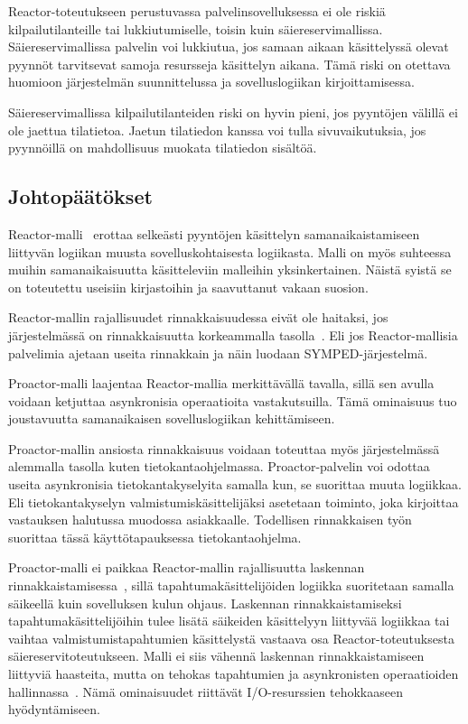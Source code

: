 \documentclass[finnish]{tktltiki2}
\theoremstyle{definition}
\theoremstyle{remark}
\begin{document}
Reactor-toteutukseen perustuvassa palvelinsovelluksessa ei ole
riskiä kilpailutilanteille tai lukkiutumiselle, toisin kuin säiereservimallissa.
Säiereservimallissa palvelin voi lukkiutua, jos samaan aikaan käsittelyssä olevat
pyynnöt tarvitsevat samoja resursseja käsittelyn aikana. Tämä riski on otettava
huomioon järjestelmän suunnittelussa ja sovelluslogiikan kirjoittamisessa.

Säiereservimallissa kilpailutilanteiden riski on hyvin pieni, jos pyyntöjen
välillä ei ole jaettua tilatietoa. Jaetun tilatiedon kanssa voi tulla
sivuvaikutuksia, jos pyynnöillä on mahdollisuus muokata tilatiedon sisältöä.

\subsection{Johtopäätökset}
Reactor-malli~\cite{schmidt_reactor:_1995} erottaa
selkeästi pyyntöjen käsittelyn
samanaikaistamiseen liittyvän
logiikan muusta sovelluskohtaisesta logiikasta.
Malli on myös suhteessa muihin samanaikaisuutta
käsitteleviin malleihin yksinkertainen.
Näistä syistä se on toteutettu useisiin
kirjastoihin ja saavuttanut vakaan suosion.

Reactor-mallin rajallisuudet rinnakkaisuudessa
eivät ole haitaksi, jos järjestelmässä on rinnakkaisuutta
korkeammalla tasolla~\cite{schmidt_reactor:_1995}. Eli
jos Reactor-mallisia palvelimia ajetaan useita rinnakkain
ja näin luodaan SYMPED-järjestelmä.

Proactor-malli laajentaa Reactor-mallia merkittävällä tavalla,
sillä sen avulla voidaan ketjuttaa asynkronisia
operaatioita vastakutsuilla. Tämä ominaisuus
tuo joustavuutta samanaikaisen sovelluslogiikan kehittämiseen.

Proactor-mallin ansiosta rinnakkaisuus
voidaan toteuttaa myös järjestelmässä alemmalla
tasolla kuten tietokantaohjelmassa.
Proactor-palvelin voi odottaa useita asynkronisia
tietokantakyselyita samalla kun, se suorittaa
muuta logiikkaa. Eli tietokantakyselyn valmistumiskäsittelijäksi
asetetaan toiminto, joka kirjoittaa vastauksen
halutussa muodossa asiakkaalle.
Todellisen rinnakkaisen työn
suorittaa tässä käyttötapauksessa tietokantaohjelma.

Proactor-malli ei paikkaa
Reactor-mallin rajallisuutta laskennan rinnakkaistamisessa~\cite{pyarali_proactor_1997},
sillä tapahtumakäsittelijöiden logiikka suoritetaan
samalla säikeellä kuin sovelluksen kulun ohjaus.
Laskennan rinnakkaistamiseksi tapahtumakäsittelijöihin
tulee lisätä säikeiden käsittelyyn liittyvää logiikkaa
tai vaihtaa valmistumistapahtumien käsittelystä vastaava
osa Reactor-toteutuksesta säiereservitoteutukseen.
Malli ei siis vähennä laskennan rinnakkaistamiseen liittyviä
haasteita, mutta on tehokas tapahtumien ja asynkronisten
operaatioiden hallinnassa~\cite{pyarali_proactor_1997}.
Nämä ominaisuudet riittävät
I/O-resurssien tehokkaaseen hyödyntämiseen.
\end{document}
